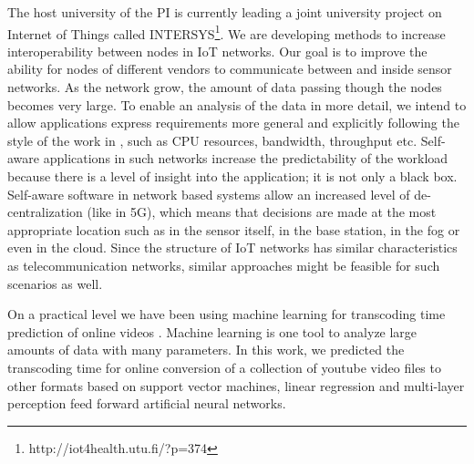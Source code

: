 \documentclass{article}
\begin{document}
The host university of the PI is currently leading a joint university project on Internet of Things called INTERSYS\footnote{http://iot4health.utu.fi/?p=374}.
We are developing methods to increase interoperability between nodes in IoT networks.
Our goal is to improve the ability for nodes of different vendors to communicate between and inside sensor networks.
As the network grow, the amount of data passing though the nodes becomes very large.
To enable an analysis of the data in more detail, we intend to allow applications express requirements more general and explicitly following the style of the work in \cite{Holmbacka:15},
such as CPU resources, bandwidth, throughput etc.
Self-aware applications in such networks increase the predictability of the workload because there is a level of insight into the application; it is not only a black box.
Self-aware software in network based systems allow an increased level of de-centralization (like in 5G), which means that decisions are made at the most appropriate location such as in the sensor itself, in the base station, in the fog or even in the cloud.
Since the structure of IoT networks has similar characteristics as telecommunication networks, similar approaches might be feasible for such scenarios as well.
\vspace{0.2cm}

On a practical level we have been using machine learning for transcoding time prediction of online videos \cite{Deneke15}.
Machine learning is one tool to analyze large amounts of data with many parameters.
In this work, we predicted the transcoding time for online conversion of a collection of youtube video files to other formats based on support vector machines, linear regression and multi-layer perception feed forward artificial neural networks.
\vspace{0.2cm}
\end{document}
